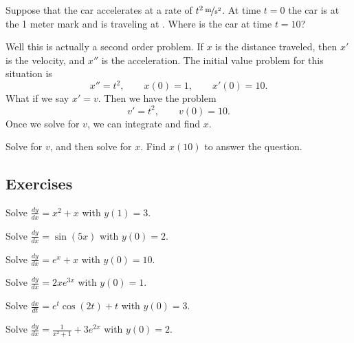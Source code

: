 \begin{example}
Suppose that the car accelerates at a rate of $\unitfrac[t^2]{m}{s^2}$.
At time $t=0$ the car is at the 1 meter mark and is traveling at
.  Where is the car at time $t=10$?
\end{example}
\begin{exampleSol}
Well this is actually a second order problem.  If $x$ is the distance
traveled, then $x'$ is the velocity, and $x''$ is the acceleration.
The initial value problem for this situation is
\begin{equation*}
x'' = t^2 , \qquad x(0) = 1 , \qquad x'(0) = 10 .
\end{equation*}
What if we say $x' = v$.  Then we have the problem
\begin{equation*}
v' = t^2, \qquad v(0) = 10 .
\end{equation*}
Once we solve for $v$, we can integrate and find $x$.
\end{exampleSol}

\begin{exercise}
Solve for $v$, and then solve for $x$.  Find $x(10)$ to answer the
question.
\end{exercise}

\subsection{Exercises}

\begin{exercise}
Solve $\frac{dy}{dx} = x^2+x$ with $y(1)=3$.
\end{exercise}

\begin{exercise}
Solve $\frac{dy}{dx} = \sin (5x)$ with $y(0)=2$.
\end{exercise}

\begin{exercise}\ansMark%
Solve $\frac{dy}{dx} = e^x + x$ with $y(0) = 10$.
\end{exercise}

\begin{exercise}
Solve $\frac{dy}{dx} = 2xe^{3x}$ with $y(0) = 1$. 
\end{exercise}

\begin{exercise}
Solve $\frac{dx}{dt} = e^t\cos(2t) + t$ with $y(0) = 3$. 
\end{exercise}

\begin{exercise}
Solve $\frac{dy}{dx} = \frac{1}{x^2 + 1} + 3e^{2x}$ with $y(0) =2$. 
\end{exercise}

